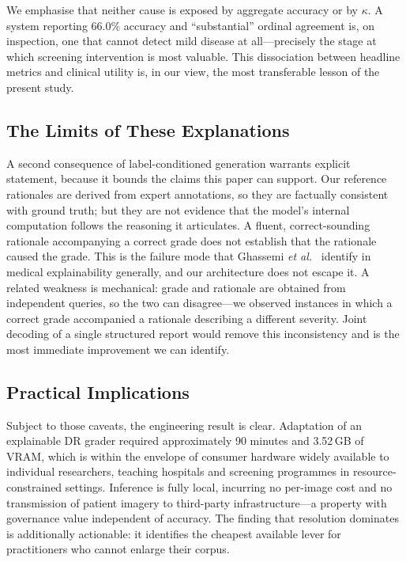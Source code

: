 \documentclass[conference]{IEEEtran}
\begin{document}
We emphasise that neither cause is exposed by aggregate accuracy or by $\kappa$.
A system reporting 66.0\% accuracy and ``substantial'' ordinal agreement is, on
inspection, one that cannot detect mild disease at all---precisely the stage at
which screening intervention is most valuable. This dissociation between headline
metrics and clinical utility is, in our view, the most transferable lesson of the
present study.

\subsection{The Limits of These Explanations}
A second consequence of label-conditioned generation warrants explicit
statement, because it bounds the claims this paper can support. Our reference
rationales are derived from expert annotations, so they are factually consistent
with ground truth; but they are not evidence that the model's internal
computation follows the reasoning it articulates. A fluent, correct-sounding
rationale accompanying a correct grade does not establish that the rationale
caused the grade. This is the failure mode that Ghassemi
\textit{et al.}~\cite{ghassemi2021false} identify in medical explainability
generally, and our architecture does not escape it. A related weakness is
mechanical: grade and rationale are obtained from independent queries, so the two
can disagree---we observed instances in which a correct grade accompanied a
rationale describing a different severity. Joint decoding of a single structured
report would remove this inconsistency and is the most immediate improvement we
can identify.

\subsection{Practical Implications}
Subject to those caveats, the engineering result is clear. Adaptation of an
explainable DR grader required approximately 90 minutes and 3.52\,GB of VRAM,
which is within the envelope of consumer hardware widely available to individual
researchers, teaching hospitals and screening programmes in resource-constrained
settings. Inference is fully local, incurring no per-image cost and no
transmission of patient imagery to third-party infrastructure---a property with
governance value independent of accuracy. The finding that resolution dominates
is additionally actionable: it identifies the cheapest available lever for
practitioners who cannot enlarge their corpus.
\end{document}
